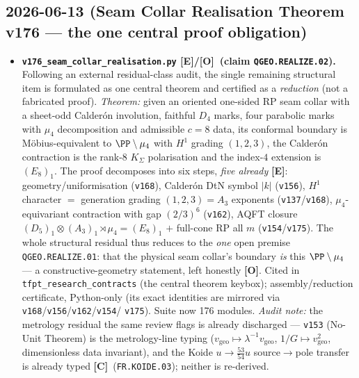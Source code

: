 \documentclass[11pt]{article}
\providecommand{\mE}{\textbf{[E]}}\providecommand{\mC}{\textbf{[C]}}
\providecommand{\mO}{\textbf{[O]}}\providecommand{\mX}{\textbf{[X]}}
\providecommand{\vref}[1]{\texttt{#1}}
\begin{document}
\subsection*{2026-06-13 (Seam Collar Realisation Theorem v176 --- the one central proof obligation)}
\begin{itemize}
\item \textbf{\texttt{v176\_seam\_collar\_realisation.py} \mE/\mO\ (claim \texttt{QGEO.REALIZE.02}).}
  Following an external residual-class audit, the single remaining structural item is formulated as
  one central theorem and certified as a \emph{reduction} (not a fabricated proof). \emph{Theorem:}
  given an oriented one-sided RP seam collar with a sheet-odd Calder\'on involution, faithful $D_4$
  marks, four parabolic marks with $\mu_4$ decomposition and admissible $c{=}8$ data, its conformal
  boundary is M\"obius-equivalent to $\PP\setminus\mu_4$ with $H^1$ grading $(1,2,3)$, the Calder\'on
  contraction is the rank-$8$ $K_\Sigma$ polarisation and the index-$4$ extension is $(E_8)_1$. The
  proof decomposes into six steps, \emph{five already} \mE: geometry/uniformisation (\vref{v168}),
  Calder\'on DtN symbol $|k|$ (\vref{v156}), $H^1$ character $=$ generation grading
  $(1,2,3)=A_3$ exponents (\vref{v137}/\vref{v168}), $\mu_4$-equivariant contraction with gap
  $(2/3)^6$ (\vref{v162}), AQFT closure $(D_5)_1{\otimes}(A_3)_1{\rtimes}\mu_4=(E_8)_1$ $+$ full-cone
  RP all $m$ (\vref{v154}/\vref{v175}). The whole structural residual thus reduces to the \emph{one}
  open premise \texttt{QGEO.REALIZE.01}: that the physical seam collar's boundary \emph{is} this
  $\PP\setminus\mu_4$ --- a constructive-geometry statement, left honestly \mO. Cited in
  \texttt{tfpt\_research\_contracts} (the central theorem keybox); assembly/reduction certificate,
  Python-only (its exact identities are mirrored via \vref{v168}/\vref{v156}/\vref{v162}/\vref{v154}/%
  \vref{v175}). Suite now 176 modules. \emph{Audit note:} the metrology residual the same review
  flags is already discharged --- \vref{v153} (No-Unit Theorem) is the metrology-line typing
  ($v_{\mathrm{geo}}\mapsto\lambda^{-1}v_{\mathrm{geo}}$, $1/G\mapsto v_{\mathrm{geo}}^2$,
  dimensionless data invariant), and the Koide $u\to\tfrac{53}{54}u$ source$\to$pole transfer is
  already typed \mC\ (\texttt{FR.KOIDE.03}); neither is re-derived.
\end{itemize}
\end{document}
